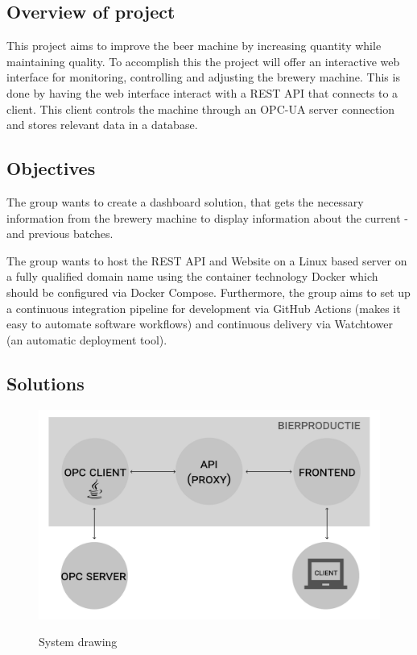 \subsection{Overview of project}
This project aims to improve the beer machine by increasing quantity while 
maintaining quality. To accomplish this the project will offer an interactive 
web interface for monitoring, controlling and adjusting the brewery machine. 
This is done by having the web interface interact with a REST API that connects 
to a client. This client controls the machine through an OPC-UA server 
connection and stores relevant data in a database.

\subsection{Objectives}
The group wants to create a dashboard solution, that gets the necessary
information from the brewery machine to display information about the current
- and previous batches.

The group wants to host the REST API and Website on a Linux based server on a
fully qualified domain name using the container technology Docker which should
be configured via Docker Compose. Furthermore, the group aims to set up a
continuous integration pipeline for development via GitHub Actions (makes it
easy to automate software workflows) and continuous delivery via Watchtower (an
automatic deployment tool).

\subsection{Solutions}
\begin{figure}[h]
\centering 
\includegraphics[scale=0.3]{../project_proposal/images/system_drawing.pdf}
\label{figure:System_drawing}
\caption{System drawing} 
\end{figure}


